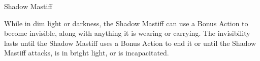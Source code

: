 \begin{DndMonster}[width=0.5\textwidth]{Shadow Mastiff\label{monster:ShadowMastiff}}
	While in dim light or darkness, the Shadow Mastiff can use a Bonus Action to become invisible, along with anything it is wearing or carrying. The invisibility lasts until the Shadow Mastiff uses a Bonus Action to end it or until the Shadow Mastiff attacks, is in bright light, or is incapacitated.
\end{DndMonster}